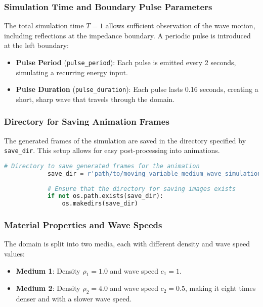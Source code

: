 \documentclass{article}
\begin{document}
		\subsubsection{Simulation Time and Boundary Pulse Parameters}
		
		The total simulation time \( T = 1 \) allows sufficient observation of the wave motion, including reflections at the impedance boundary. A periodic pulse is introduced at the left boundary:
		\begin{itemize}
			\item \textbf{Pulse Period} (\texttt{pulse\_period}): Each pulse is emitted every 2 seconds, simulating a recurring energy input.
			\item \textbf{Pulse Duration} (\texttt{pulse\_duration}): Each pulse lasts 0.16 seconds, creating a short, sharp wave that travels through the domain.
		\end{itemize}
		
		\subsubsection{Directory for Saving Animation Frames}
		
		The generated frames of the simulation are saved in the directory specified by \texttt{save\_dir}. This setup allows for easy post-processing into animations.
		
		\begin{lstlisting}[language=Python]
			# Directory to save generated frames for the animation
			save_dir = r'path/to/moving_variable_medium_wave_simulation'
			
			# Ensure that the directory for saving images exists
			if not os.path.exists(save_dir):
				os.makedirs(save_dir)
		\end{lstlisting}
		
		\subsubsection{Material Properties and Wave Speeds}
		
		The domain is split into two media, each with different density and wave speed values:
		\begin{itemize}
			\item \textbf{Medium 1}: Density \( \rho_1 = 1.0 \) and wave speed \( c_1 = 1 \).
			\item \textbf{Medium 2}: Density \( \rho_2 = 4.0 \) and wave speed \( c_2 = 0.5 \), making it eight times denser and with a slower wave speed.
		\end{itemize}
		
\end{document}
